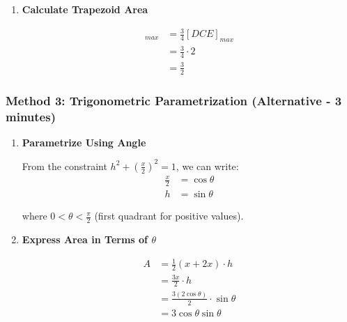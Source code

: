 \documentclass[12pt]{article}
\begin{document}
\begin{solutionbox}
\begin{enumerate}[leftmargin=*]
    We need to maximize $[DCE]$, which is an isosceles triangle with legs $ED = EC = 2$.
    
    For an isosceles triangle with legs of length $\ell$ and angle $\theta$ between them:
    \begin{equation}
        \text{Area} = \frac{1}{2}\ell^2 \sin\theta
    \end{equation}
    
    For $\triangle DCE$ with $\ell = 2$:
    \begin{equation}
        [DCE] = \frac{1}{2}(2)(2)\sin\theta = 2\sin\theta
    \end{equation}
    
    This is maximized when $\sin\theta = 1$, i.e., $\theta = 90^\circ$.
    
    Maximum: $[DCE]_{max} = 2(1) = 2$
    
    \item \textbf{Calculate Trapezoid Area}
    
    \begin{align*}
        [ABCD]_{max} &= \frac{3}{4}[DCE]_{max} \\
        &= \frac{3}{4} \cdot 2 \\
        &= \frac{3}{2}
    \end{align*}
\end{enumerate}

\subsubsection*{Method 3: Trigonometric Parametrization (Alternative - 3 minutes)}

\begin{enumerate}[leftmargin=*]
    \item \textbf{Parametrize Using Angle}
    
    From the constraint $h^2 + \left(\frac{x}{2}\right)^2 = 1$, we can write:
    \begin{align*}
        \frac{x}{2} &= \cos\theta \\
        h &= \sin\theta
    \end{align*}
    
    where $0 < \theta < \frac{\pi}{2}$ (first quadrant for positive values).
    
    \item \textbf{Express Area in Terms of $\theta$}
    
    \begin{align*}
        A &= \frac{1}{2}(x + 2x) \cdot h \\
        &= \frac{3x}{2} \cdot h \\
        &= \frac{3(2\cos\theta)}{2} \cdot \sin\theta \\
        &= 3\cos\theta \sin\theta
    \end{align*}
    

\end{enumerate}
\end{solutionbox}
\end{document}
